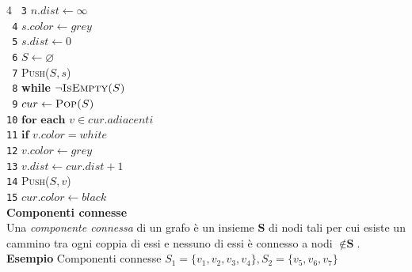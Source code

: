 \documentclass[10pt,landscape]{article}
\begin{document}
\begin{multicols*}{4}
                \verb| 3|\hspace*{1.5em} $n.dist \leftarrow \infty$\\
                \verb| 4|\hspace*{0.5em} $s.color \leftarrow grey$\\
                \verb| 5|\hspace*{0.5em} $s.dist \leftarrow 0$\\
                \verb| 6|\hspace*{0.5em} $S \leftarrow \varnothing$\\
                \verb| 7|\hspace*{0.5em} \textsc{Push($S,s$)}\\
                \verb| 8|\hspace*{0.5em} \textbf{while} $\lnot \textsc{IsEmpty($S$)}$\\
                \verb| 9|\hspace*{1.5em} $cur \leftarrow \textsc{Pop($S$)}$\\
                \verb|10|\hspace*{1.5em} $\textbf{for each } v \in cur.adiacenti$\\
                \verb|11|\hspace*{2.5em} $\textbf{if } v.color = white$\\
                \verb|12|\hspace*{3.5em} $v.color \leftarrow grey$\\
                \verb|13|\hspace*{3.5em} $v.dist \leftarrow cur.dist+1$\\
                \verb|14|\hspace*{3.5em} \textsc{Push($S,v$)}\\
                \verb|15|\hspace*{1.5em} $cur.color \leftarrow black$\\ [5pt]
                \textbf{Componenti connesse}\\ [3pt]
                Una \textit{componente connessa} di un grafo è un insieme $\textbf{S}$ di nodi tali per cui esiste
                un cammino tra ogni coppia di essi e nessuno di essi è connesso a nodi  $\notin \textbf{S}$.\\ [5pt]
                \textbf{Esempio} Componenti connesse $S_1 = \{v_1,v_2,v_3,v_4\}, S_2 = \{v_5,v_6,v_7\}$ \\ [3pt]
                \begin{center}
                        \begin{tikzpicture}[-, >=stealth', node distance=1.5cm, on grid, auto]

\end{tikzpicture}
\end{center}
\end{multicols*}
\end{document}
